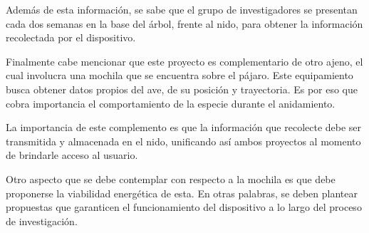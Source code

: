 Además de esta información, se sabe que el grupo de investigadores se presentan cada dos semanas en la base del árbol, frente al nido, para obtener la información recolectada por el dispositivo.

Finalmente cabe mencionar que este proyecto es complementario de otro ajeno, el cual involucra una mochila que se encuentra sobre el pájaro. Este equipamiento busca obtener datos propios del ave, de su posición y trayectoria. Es por eso que cobra importancia el comportamiento de la especie durante el anidamiento.

La importancia de este complemento es que la información que recolecte debe ser transmitida y almacenada en el nido, unificando así ambos proyectos al momento de brindarle acceso al usuario. 

Otro aspecto que se debe contemplar con respecto a la mochila es que debe proponerse la viabilidad energética de esta. En otras palabras, se deben plantear propuestas que garanticen el funcionamiento del dispositivo a lo largo del proceso de investigación.

%